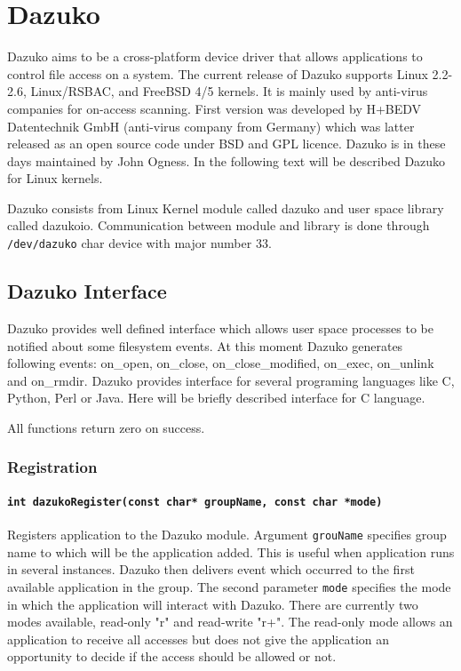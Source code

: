 \chapter{Dazuko}
\label{lab:dazuko}
Dazuko aims to be a cross-platform device driver that allows applications to control
file access on a system. The current release of Dazuko supports Linux 2.2-2.6,
Linux/RSBAC, and FreeBSD 4/5 kernels. It is mainly used by anti-virus companies for
on-access scanning. First version was developed by H+BEDV Datentechnik GmbH (anti-virus
company from Germany) which was latter released as an open source code under BSD and
GPL licence. Dazuko is in these days maintained by John Ogness. In the following text
will be described Dazuko for Linux kernels.

Dazuko consists from Linux Kernel module called dazuko and user space library called
dazukoio. Communication between module and library is done through
\texttt{/dev/dazuko} char device with major number 33. 

\section{Dazuko Interface}
Dazuko provides well defined interface which allows user space processes to be
notified about some filesystem events. At this moment Dazuko generates following
events: on\_open, on\_close, on\_close\_modified, on\_exec, on\_unlink and on\_rmdir.
Dazuko provides interface for several programing languages like C, Python, Perl or
Java. Here will be briefly described interface for C language.

All functions return zero on success.

\subsection*{Registration}
\subsubsection{\texttt{int dazukoRegister(const char* groupName, const char *mode)}}
Registers application to the Dazuko module. Argument \texttt{grouName} specifies group
name to which will be the application added. This is useful when application runs in
several instances. Dazuko then delivers event which occurred to the first available
application in the group. The second parameter \texttt{mode} specifies the mode in
which the application will interact with Dazuko. There are currently two modes
available, read-only "r" and read-write "r+". The read-only mode allows an application
to receive all accesses but does not give the application an opportunity to decide if
the access should be allowed or not.

